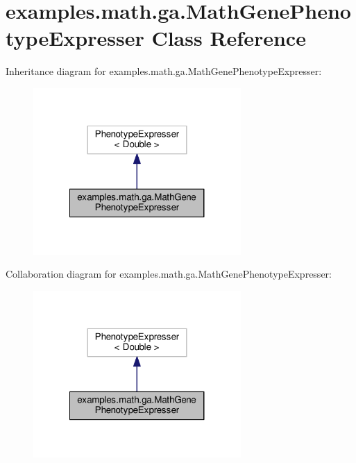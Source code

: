 \hypertarget{classexamples_1_1math_1_1ga_1_1_math_gene_phenotype_expresser}{\section{examples.\-math.\-ga.\-Math\-Gene\-Phenotype\-Expresser Class Reference}
\label{classexamples_1_1math_1_1ga_1_1_math_gene_phenotype_expresser}
}


Inheritance diagram for examples.\-math.\-ga.\-Math\-Gene\-Phenotype\-Expresser\-:
\nopagebreak
\begin{figure}[H]
\begin{center}
\leavevmode
\includegraphics[width=224pt]{classexamples_1_1math_1_1ga_1_1_math_gene_phenotype_expresser__inherit__graph}
\end{center}
\end{figure}


Collaboration diagram for examples.\-math.\-ga.\-Math\-Gene\-Phenotype\-Expresser\-:
\nopagebreak
\begin{figure}[H]
\begin{center}
\leavevmode
\includegraphics[width=224pt]{classexamples_1_1math_1_1ga_1_1_math_gene_phenotype_expresser__coll__graph}
\end{center}
\end{figure}
